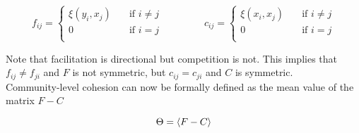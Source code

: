 \documentclass[titlepage,11pt]{article}
\begin{document}
\begin{linenumbers}
\begin{linenomath*}
				\begin{equation}	
					f_{ij} = 
					\begin{cases}
					\xi(y_i, x_j)&\quad\text{if } i \neq j \\
					0&\quad\text{if } i = j \\
					\end{cases}
					\hspace{50pt}
					c_{ij} = 
					\begin{cases}
					\xi(x_i, x_j)&\quad\text{if } i \neq j \\
					0&\quad\text{if } i = j \\
					\end{cases}
				\end{equation}
				
			\end{linenomath*}
			Note that facilitation is directional but competition is not. This implies that $ f_{ij} \neq f_{ji}$ and $ F $ is not symmetric, but $ c_{ij} = c_{ji} $ and $ C $ is symmetric.\\
			Community-level cohesion can now be formally defined as the mean value of the matrix $ F - C $
			\begin{linenomath*}
				\begin{equation}
				\Theta = \braket{F - C}
				\end{equation}
			\end{linenomath*}

\end{linenumbers}
\end{document}
